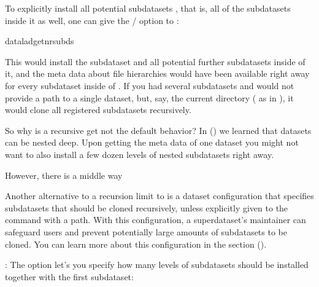 \ignorespaces 
\sphinxAtStartPar
To explicitly install all potential subdatasets , that is,
all of the subdatasets inside it as well, one can give the
/ option to :

\begin{sphinxVerbatim}[commandchars=\\\{\}]
dataladget\PYGZhy{}n\PYGZhy{}r\PYGZlt{}subds\PYGZgt{}
\end{sphinxVerbatim}

\sphinxAtStartPar
This would install the  subdataset and all potential further
subdatasets inside of it, and the meta data about file hierarchies would
have been available right away for every subdataset inside of . If you
had several subdatasets and would not provide a path to a single dataset,
but, say, the current directory ( as in ), it
would clone all registered subdatasets recursively.

\sphinxAtStartPar
So why is a recursive get not the default behavior?
In {\hyperref[\detokenize{basics/101-106-nesting:nesting}]{}} () we learned that datasets can be nested  deep.
Upon getting the meta data of one dataset you might not want to also install
a few dozen levels of nested subdatasets right away.

\sphinxAtStartPar
However, there is a middle way%
\begin{footnote}\sphinxAtStartFootnote
Another alternative to a recursion limit to  is
a dataset configuration that specifies subdatasets that should  be
cloned recursively, unless explicitly given to the command with a path. With
this configuration, a superdataset’s maintainer can safeguard users and prevent
potentially large amounts of subdatasets to be cloned.
You can learn more about this configuration in the section {\hyperref[\detokenize{basics/101-123-config2:config2}]{}} ().
%
\end{footnote}: The  option let’s
you specify how many levels of subdatasets should be installed together
with the first subdataset:

